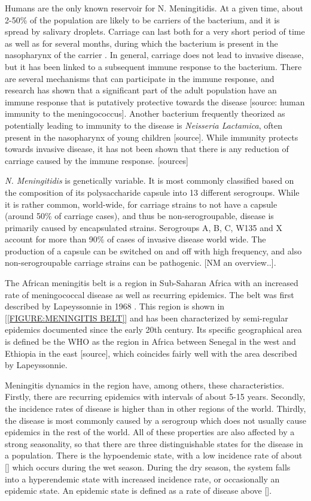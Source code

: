 \documentclass[10pt,a4paper]{article}
\begin{document}
Humans are the only known reservoir for N. Meningitidis. At a given time, about 2-50\% of the population are likely to be carriers of the bacterium, and it is spread by salivary droplets. Carriage can last both for a very short period of time as well as for several months, during which the bacterium is present in the nasopharynx of the carrier \cite{taha2002duality}. In general, carriage does not lead to invasive disease, but it has been linked to a subsequent immune response to the bacterium. There are several mechanisms that can participate in the immune response, and research has shown that a significant part of the adult population have an immune response that is putatively protective towards the disease [source: human immunity to the meningococcus]. Another bacterium frequently theorized as potentially leading to immunity to the disease is \emph{Neisseria Lactamica}, often present in the nasopharynx of young children [source]. While immunity protects towards invasive disease, it has not been shown that there is any reduction of carriage caused by the immune response. [sources]

\emph{N. Meningitidis} is genetically variable. It is most commonly classified based on the composition of its polysaccharide capsule into 13 different serogroups. While it is rather common, world-wide, for carriage strains to not have a capsule (around 50\% of carriage cases), and thus be non-serogroupable, disease is primarily caused by encapsulated strains. Serogroups A, B, C, W135 and X account for more than 90\% of cases of invasive disease world wide. The production of a capsule can be switched on and off with high frequency, and also non-serogroupable carriage strains can be pathogenic. [NM an overview..].

The African meningitis belt is a region in Sub-Saharan Africa with an increased rate of meningococcal disease as well as recurring epidemics. The belt was first described by Lapeyssonnie in 1968 \cite{lapeyssonnie}. This region is shown in \cref{[FIGURE:MENINGITIS BELT]} and has been characterized by semi-regular epidemics documented since the early 20th century. Its specific geographical area is defined be the WHO as the region in Africa between Senegal in the west and Ethiopia in the east [source], which coincides fairly well with the area described by Lapeyssonnie.

Meningitis dynamics in the region have, among others, these characteristics. Firstly, there are recurring epidemics with intervals of about 5-15 years. Secondly, the incidence rates of disease is higher than in other regions of the world. Thirdly, the disease is most commonly caused by a serogroup which does not usually cause epidemics in the rest of the world. All of these properties are also affected by a strong seasonality, so that there are three distinguishable states for the disease in a population. There is the hypoendemic state, with a low incidence rate of about [] which occurs during the wet season. During the dry season, the system falls into a hyperendemic state with increased incidence rate, or occasionally an epidemic state. An epidemic state is defined as a rate of disease above []. \cite{mueller2010hypothetical}
\end{document}
